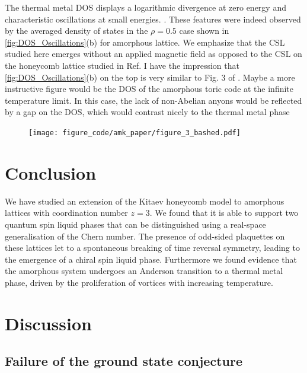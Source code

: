 The thermal metal DOS displays a logarithmic divergence at zero energy and characteristic oscillations at small energies. \autocite{bocquet_disordered_2000,selfThermallyInducedMetallic2019}. These features were indeed observed by the averaged density of states in the \(\rho = 0.5\) case shown in \protect\hyperlink{fig:DOS_Oscillations}{{[}fig:DOS\_Oscillations{]}}(b) for amorphous lattice. We emphasize that the CSL studied here emerges without an applied magnetic field as opposed to the CSL on the honeycomb lattice studied in Ref. \autocite{selfThermallyInducedMetallic2019} I have the impression that \protect\hyperlink{fig:DOS_Oscillations}{{[}fig:DOS\_Oscillations{]}}(b) on the top is very similar to Fig. 3 of \autocite{selfThermallyInducedMetallic2019}. Maybe a more instructive figure would be the DOS of the amorphous toric code at the infinite temperature limit. In this case, the lack of non-Abelian anyons would be reflected by a gap on the DOS, which would contrast nicely to the thermal metal phase

\begin{figure}
\hypertarget{fig:figure_3_bashed}{%
\centering
\texttt{[image: figure\_code/amk\_paper/figure\_3\_bashed.pdf]}
\caption{}\label{fig:figure_3_bashed}
}
\end{figure}

\hypertarget{conclusion}{%
\section{Conclusion}\label{conclusion}}

We have studied an extension of the Kitaev honeycomb model to amorphous lattices with coordination number \(z= 3\). We found that it is able to support two quantum spin liquid phases that can be distinguished using a real-space generalisation of the Chern number. The presence of odd-sided plaquettes on these lattices let to a spontaneous breaking of time reversal symmetry, leading to the emergence of a chiral spin liquid phase. Furthermore we found evidence that the amorphous system undergoes an Anderson transition to a thermal metal phase, driven by the proliferation of vortices with increasing temperature.

\hypertarget{discussion}{%
\section{Discussion}\label{discussion}}

\hypertarget{failure-of-the-ground-state-conjecture}{%
\subsection{Failure of the ground state conjecture}\label{failure-of-the-ground-state-conjecture}}

